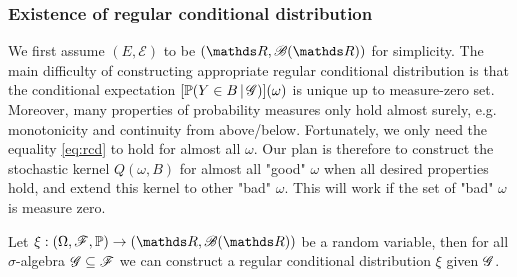\begin{unexaminable}
\subsubsection{Existence of regular conditional distribution}

We first assume $(E,\mathcal{E})$ to be $(\R,\B(\R))$ for simplicity. The main difficulty of constructing appropriate regular conditional distribution is that the conditional expectation $[\mathbb{P}(Y \in B \,|\, \mathcal{G})](\omega)$ is unique up to measure-zero set. Moreover, many properties of probability measures only hold almost surely, e.g. monotonicity and continuity from above/below. Fortunately, we only need the equality \eqref{eq:rcd} to hold for almost all $\omega$. Our plan is therefore to construct the stochastic kernel $Q(\omega,B)$ for almost all "good" $\omega$ when all desired properties hold, and extend this kernel to other "bad" $\omega$. This will work if the set of "bad" $\omega$ is measure zero.

\begin{theorem} 
Let $\xi:(\Omega,\F,\p) \to (\R,\B(\R))$ be a random variable, then for all $\sigma$-algebra $\mathcal{G} \subseteq \mathcal{F}$ we can construct a regular conditional distribution $\xi$ given $\mathcal{G}$.
\end{theorem}


\end{unexaminable}
